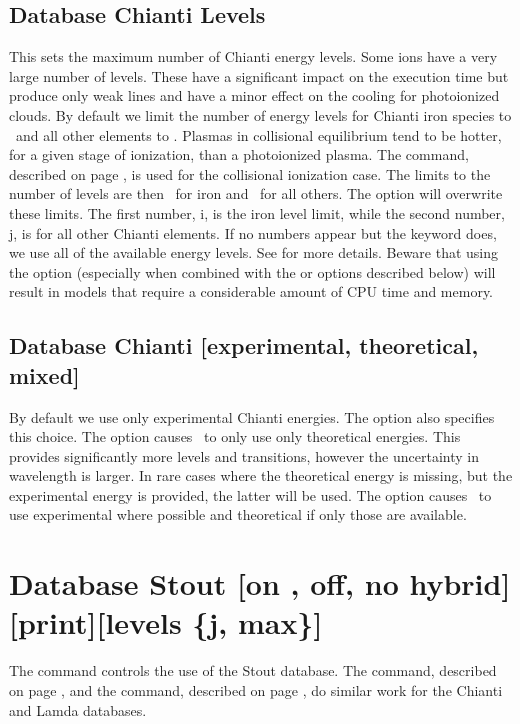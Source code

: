 \subsection{Database Chianti Levels} 
\label{sec:AtomChiantiLevels}
This sets the maximum number of Chianti energy levels. 
Some ions have a very large number of levels.
These have a significant impact
on the execution time but produce only weak lines and have a minor effect
on the cooling for photoionized clouds.
By default we limit the number of energy levels for Chianti iron species to 
\nDefaultPhotoLevelsFe\ and all other elements to \nDefaultPhotoLevels.
Plasmas in collisional equilibrium tend to be hotter, for a given
stage of ionization, than a photoionized plasma.  
The  command, described on
page \pageref{sec:CommandCoronalEquilibrium}, is used for
the collisional ionization case.
The limits to the number of levels are then \nDefaultCollLevelsFe\ for iron 
and \nDefaultCollLevels\ for all others.
The  option will overwrite these limits.
The first number, i, is the iron level limit, while the second number, 
j, is for all other Chianti elements.
If no numbers appear but the keyword  does, we use all 
of the available energy levels.
See \citet{2013MNRAS.429.3133L} for more details.
Beware that using the  option (especially when combined with
the  or  options described below)
will result in models that require a considerable amount of CPU time and memory.

\subsection{Database Chianti [experimental, theoretical, mixed]}
\label{sec:AtomChiantiExperimental}
By default we use only experimental Chianti energies.
The  option also specifies this choice.
The  option causes \Cloudy\ to only use only theoretical 
energies.
This provides significantly more levels and transitions, 
however the uncertainty in wavelength is larger.
In rare cases where the theoretical energy is missing, but the experimental energy
is provided, the latter will be used.
The  option causes \Cloudy\ to use experimental where
possible and theoretical if only those are available.

\section{Database Stout [on , off, no hybrid][print][levels \{j, max\}]}
\label{sec:SetStout}
The command controls the use of the Stout database.
The  command, described on page \pageref{sec:SetChianti},
and the  command, described on page \pageref{sec:SetLamda},
do similar work for the Chianti and Lamda databases.

